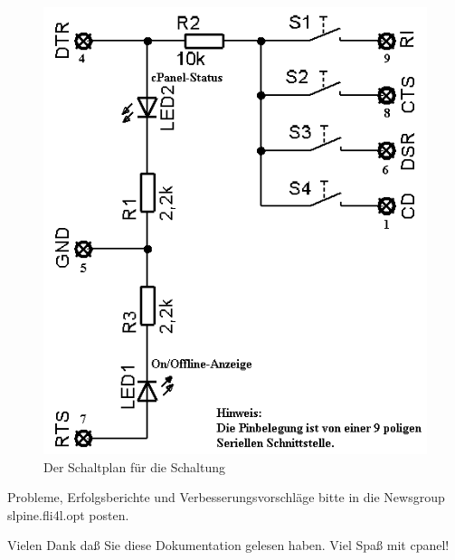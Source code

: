   \begin{figure}[htbp]
    \centering
    \includegraphics[width=485pt]{schematic}
    \caption{Der Schaltplan für die Schaltung}
    \label{fig:schaltplan}
  \end{figure}



Probleme, Erfolgsberichte und Verbesserungsvorschläge bitte in die Newsgroup slpine.fli4l.opt posten.

Vielen Dank daß Sie diese Dokumentation gelesen haben. Viel 
Spaß mit cpanel!
